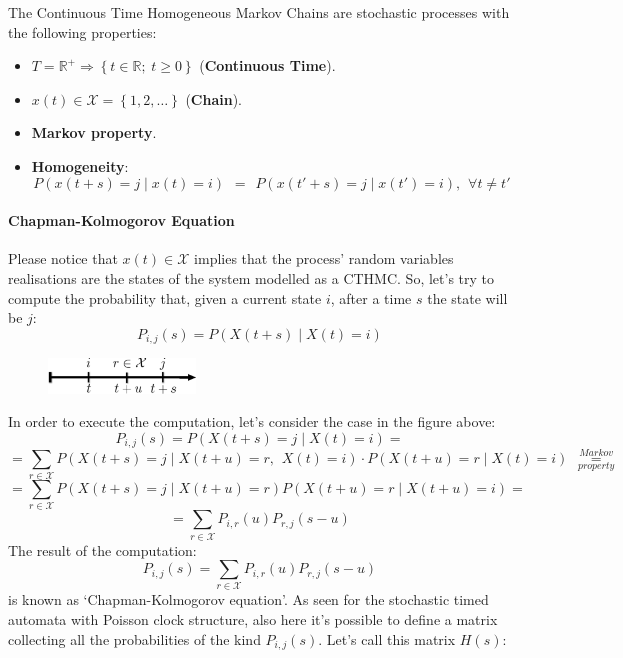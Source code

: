 \documentclass[12pt,a4paper]{article}
\begin{document}
\bigskip
\noindent
The Continuous Time Homogeneous Markov Chains are stochastic processes with the following properties:
\begin{itemize}
\item $T=\mathbb{R}^+\Rightarrow\left\lbrace t\in\mathbb{R};\hspace{3pt}t\geq 0\right\rbrace $ (\textbf{Continuous Time}).
\item $x(t)\in \mathcal{X}=\left\lbrace 1,2,\dots\right\rbrace$ (\textbf{Chain}).
\item \textbf{Markov property}.
\item \textbf{Homogeneity}: 
$$
P\left(x\left(t+s\right)=j \mid x\left(t\right)=i\right)
\hspace{5pt}=\hspace{5pt}
P\left(x\left(t'+s\right)=j \mid x\left(t'\right)=i\right),\hspace{5pt}\forall t\neq t'
$$
\end{itemize} 
\paragraph{Chapman-Kolmogorov Equation}
Please notice that $x(t)\in \mathcal{X}$ implies that the process' random variables realisations are the states of the system modelled as a CTHMC. So, let's try to compute the probability that, given a current state $i$, after a time $s$ the state will be $j$:
$$
P_{i,j}(s)=P\left(X\left(t+s\right) \mid  X\left(t\right)=i\right)
$$
\begin{figure}[H]
\begin{center}
\includegraphics[width=0.35\textwidth]{IMG/CTHMC1.eps}
\label{Picture 3}
\end{center}
\end{figure}
\noindent
In order to execute the computation, let's consider the case in the figure above:
$$
P_{i,j}(s)=P\left(X\left(t+s\right)=j \mid  X\left(t\right)=i\right)=
$$
$$
=\sum_{r\in \mathcal{X}}{
P\left(X\left(t+s\right)=j \mid  X\left(t+u\right)=r,\hspace{5pt} X\left(t\right)=i\right)
}\cdot 
P\left(X\left(t+u\right)=r \mid X\left(t\right)=i\right)
\hspace{5pt}\overset{Markov}{\underset{property}{=}}
$$
$$
=\sum_{r\in \mathcal{X}}{
P\left(X\left(t+s\right)=j \mid  X\left(t+u\right)=r\right)
P\left(X\left(t+u\right)=r \mid  X\left(t+u\right)=i\right)
}=
$$
$$
=\sum_{r\in \mathcal{X}}{
P_{i,r}\left(u\right)
P_{r,j}\left(s-u\right)
}
$$
The result of the computation:
\begin{equation}
P_{i,j}(s)
=\sum_{r\in \mathcal{X}}{
P_{i,r}\left(u\right)
P_{r,j}\left(s-u\right)
}
\end{equation}
is known as `Chapman-Kolmogorov equation'. As seen for the stochastic timed automata with Poisson clock structure, also here it's possible to define a matrix collecting all the probabilities of the kind $P_{i,j}(s)$. Let's call this matrix $H(s)$:
\end{document}
